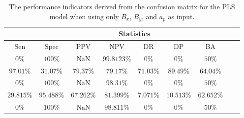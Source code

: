 \begin{table}[!ht]
	\centering
	\begin{tabular}{|c|c|c|c|c|c|c|c|c|}
		\hline
		 & \multicolumn{7}{c|}{Statistics} \\ \hline
		Sen & Spec & PPV & NPV & DR & DP & BA \\ \hline
		$0\%$ & $100\%$ & NaN & $99.8123\%$ & $0\%$ & $0\%$ & $50\%$ \\ \hline
		$97.01\%$ & $31.07\%$ & $79.37\%$ & $79.17\%$ & $71.03\%$ & $89.49\%$ & $64.04\%$ \\ \hline
		$0\%$ & $100\%$ & NaN & $98.31\%$ & $0\%$ & $0\%$ & $50\%$ \\ \hline
		$29.815\%$ & $95.488\%$ & $67.262\%$ & $81.399\%$ & $7.071\%$ & $10.513\%$ & $62.652\%$ \\ \hline
		$0\%$ & $100\%$ & NaN & $98.811\%$ & $0\%$ & $0\%$ & $50\%$ \\ \hline
	\end{tabular}
	\caption{The performance indicators derived from the confusion matrix for the PLS model when using only $B_{x}$, $B_{y}$, and $a_{p}$ as input.}
	\label{tab:cs:xyap:pls}
\end{table}
